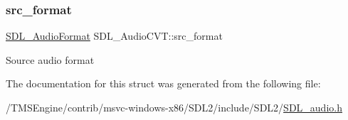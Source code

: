 \subsubsection{\texorpdfstring{src\+\_\+format}{src\_format}}
{\footnotesize\ttfamily \hyperlink{_s_d_l__audio_8h_a491ed103fd25d920c4e6b7495217ce66}{S\+D\+L\+\_\+\+Audio\+Format} S\+D\+L\+\_\+\+Audio\+C\+V\+T\+::src\+\_\+format}

Source audio format 

The documentation for this struct was generated from the following file\+:\begin{DoxyCompactItemize}
\item 
/\+T\+M\+S\+Engine/contrib/msvc-\/windows-\/x86/\+S\+D\+L2/include/\+S\+D\+L2/\hyperlink{_s_d_l__audio_8h}{S\+D\+L\+\_\+audio.\+h}\end{DoxyCompactItemize}
